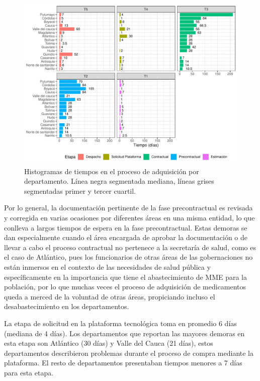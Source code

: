\documentclass[
  oneside]{book}
\begin{document}
\begin{figure}[t]

{\centering \includegraphics[width=0.95\linewidth]{InformeFinal_files/figure-latex/EtapasProcesoAdquisicionDetalle-1} 

}

\caption{Histogramas de tiempos en el proceso de adquisición por departamento. Línea negra segmentada mediana, líneas grises segmentadas primer y tercer cuartil.}\label{fig:EtapasProcesoAdquisicionDetalle}
\end{figure}

Por lo general, la documentación pertinente de la fase precontractual es revisada y corregida en varias ocasiones por diferentes áreas en una misma entidad, lo que conlleva a largos tiempos de espera en la fase precontractual. Estas demoras se dan especialmente cuando el área encargada de aprobar la documentación o de llevar a cabo el proceso contractual no pertenece a la secretaría de salud, como es el caso de Atlántico, pues los funcionarios de otras áreas de las gobernaciones no están inmersos en el contexto de las necesidades de salud pública y específicamente en la importancia que tiene el abastecimiento de MME para la población, por lo que muchas veces el proceso de adquisición de medicamentos queda a merced de la voluntad de otras áreas, propiciando incluso el desabastecimiento en los departamentos.

La etapa de solicitud en la plataforma tecnológica toma en promedio 6 días (mediana de 4 días). Los departamentos que reportan las mayores demoras en esta etapa son Atlántico (30 días) y Valle del Cauca (21 días), estos departamentos describieron problemas durante el proceso de compra mediante la plataforma. El resto de departamentos presentaban tiempos menores a 7 días para esta etapa.
\end{document}
